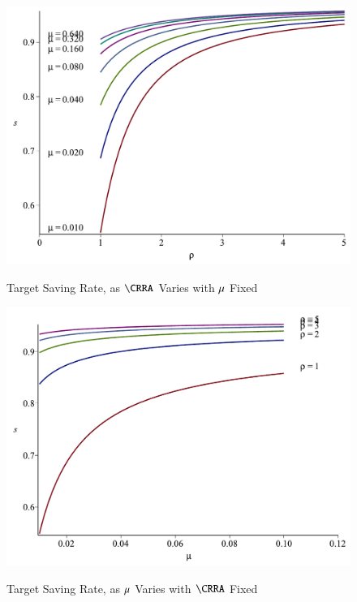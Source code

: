 \documentclass[titlepage,abstract]{\econtex}\newcommand{\texname}{ctDiscrete}
\begin{document}
\begin{figure}%
\caption{Target Saving Rate, as $\CRRA$ Varies with $\mu$ Fixed}%
\medskip%
\includegraphics{./Figures/sTargetUrateFixedCRRAVaries_4}%
\label{fig:sTargetUrateFixedCRRAVaries}%
\end{figure}

\begin{figure}%
\caption{Target Saving Rate, as $\mu$ Varies with $\CRRA$ Fixed}%
\medskip%
\includegraphics{./Figures/sTargetCRRAFixedUrateVaries_4}%
\label{fig:sTargetCRRAFixedUrateVaries}%
\end{figure}
\end{document}
